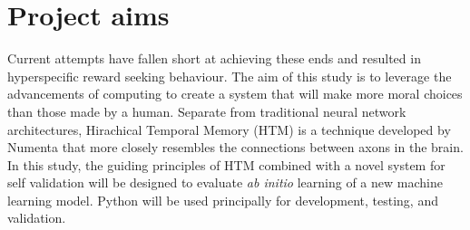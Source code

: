 \section{Project aims}
Current attempts have fallen short at achieving these ends and resulted in hyperspecific reward seeking behaviour.
The aim of this study is to leverage the advancements of computing to create a system that will make more moral choices than those made by a human.
Separate from traditional neural network architectures, Hirachical Temporal Memory (HTM) is a technique developed by Numenta that more closely resembles the connections between axons in the brain.
In this study, the guiding principles of HTM combined with a novel system for self validation will be designed to evaluate \emph{ab initio} learning of a new machine learning model.
Python will be used principally for development, testing, and validation.

